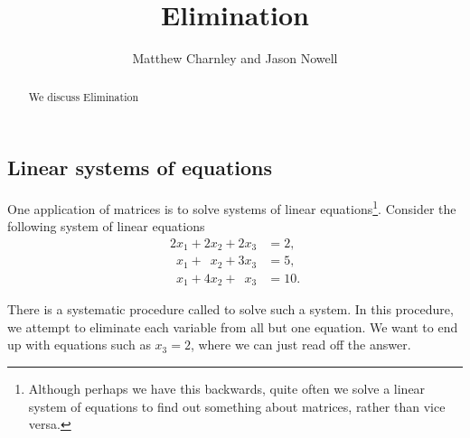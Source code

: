 \documentclass{ximera}
\title{Elimination}
\author{Matthew Charnley and Jason Nowell}
\begin{document}
\begin{abstract}
    We discuss Elimination
\end{abstract}
\maketitle


\label{elim:section}


\subsection{Linear systems of equations}

One application of matrices is to solve systems of linear equations\footnote{Although perhaps we have this backwards, quite often we solve a linear system of equations to find out something about matrices, rather than vice versa.}. Consider the following system of linear equations
\begin{equation} \label{linalg:elim:eq}
    \begin{aligned}
              2 x_1 +           2 x_2 +           2 x_3 & = 2 , \\
    \phantom{9} x_1 + \phantom{9} x_2 +           3 x_3 & = 5 , \\
    \phantom{9} x_1 +           4 x_2 + \phantom{9} x_3 & = 10 .
    \end{aligned}
\end{equation}

There is a systematic procedure called \emph{} to solve such a system. In this procedure, we attempt to eliminate each variable from all but one equation. We want to end up with equations such as $x_3 = 2$, where we can just read off the answer.
\end{document}

